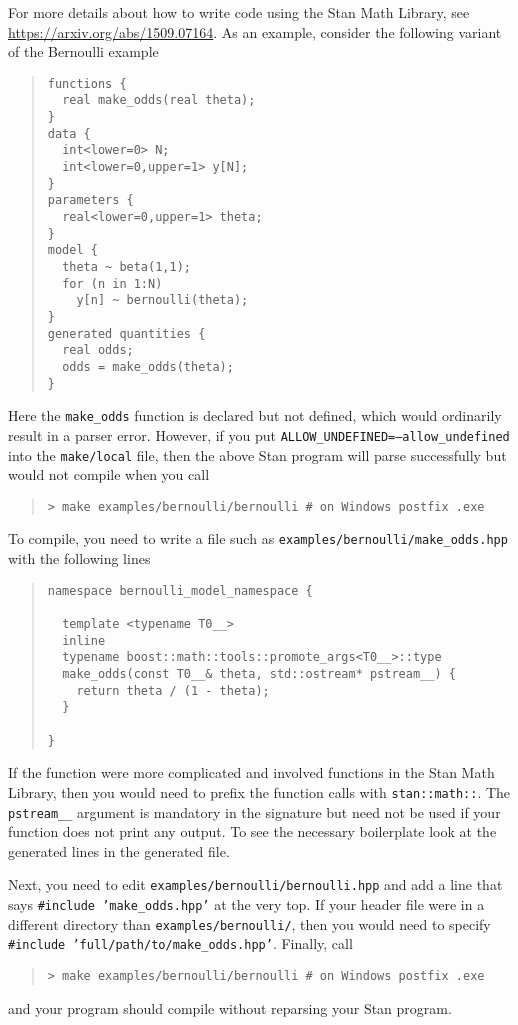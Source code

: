 For more details about how to write \Cpp code using the Stan Math
Library, see \url{https://arxiv.org/abs/1509.07164}. As an example,
consider the following variant of the Bernoulli example
%
\begin{quote}
\begin{Verbatim}
functions {
  real make_odds(real theta);
}
data {
  int<lower=0> N;
  int<lower=0,upper=1> y[N];
}
parameters {
  real<lower=0,upper=1> theta;
}
model {
  theta ~ beta(1,1);
  for (n in 1:N)
    y[n] ~ bernoulli(theta);
}
generated quantities {
  real odds;
  odds = make_odds(theta);
}
\end{Verbatim}
\end{quote}
%
Here the {\tt make\_odds} function is declared but not defined,
which would ordinarily result in a parser error. However, if you
put {\tt ALLOW\_UNDEFINED=--allow\_undefined} into the
{\tt make/local} file, then the above Stan program will parse
successfully but would not compile when you call
%
\begin{quote}
\begin{Verbatim}[fontshape=sl]
> make examples/bernoulli/bernoulli # on Windows postfix .exe 
\end{Verbatim}
\end{quote}
%
To compile, you need to write a file such as 
{\tt examples/bernoulli/make\_odds.hpp} with the following lines
%
\begin{quote}
\begin{Verbatim}
namespace bernoulli_model_namespace {

  template <typename T0__>
  inline
  typename boost::math::tools::promote_args<T0__>::type
  make_odds(const T0__& theta, std::ostream* pstream__) {
    return theta / (1 - theta);
  }

}
\end{Verbatim}
\end{quote}
%
If the function were more complicated and involved functions
in the Stan Math Library, then you would need to prefix the
function calls with {\tt stan::math::}. The {\tt pstream\_\_}
argument is mandatory in the signature but need not be used
if your function does not print any output. To see the 
necessary boilerplate look at the generated lines in the
generated \Cpp file.

Next, you need to edit {\tt examples/bernoulli/bernoulli.hpp}
and add a line that says {\tt \#include 'make\_odds.hpp'} at
the very top. If your header file were in a different directory
than {\tt examples/bernoulli/}, then you would need to specify
{\tt \#include 'full/path/to/make\_odds.hpp'}. Finally, call
%
\begin{quote}
\begin{Verbatim}[fontshape=sl]
> make examples/bernoulli/bernoulli # on Windows postfix .exe 
\end{Verbatim}
\end{quote}
%
and your \Cpp program should compile without reparsing your
Stan program.
